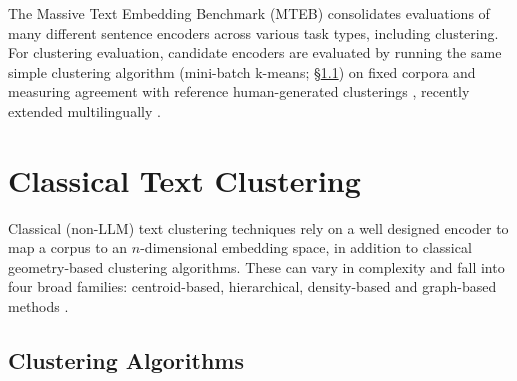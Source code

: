 \documentclass[11pt,a4paper,oneside]{report}
\begin{document}
The Massive Text Embedding Benchmark (MTEB) consolidates evaluations of many different sentence encoders across various task types, including clustering. For clustering evaluation, candidate encoders are evaluated by running the same simple clustering algorithm (mini-batch k-means; \S\ref{sec:algorithms}) on fixed corpora and measuring agreement with reference human-generated clusterings \citep{muennighoff2023mteb}, recently extended multilingually \citep{enevoldsen2025mmteb}.

\section{Classical Text Clustering}\label{sec:clustering}

Classical (non-LLM) text clustering techniques rely on a well designed encoder to map a corpus to an $n$-dimensional embedding space, in addition to classical geometry-based clustering algorithms. These can vary in complexity and fall into four broad families: centroid-based, hierarchical, density-based and graph-based methods \citep{xie2016dec,zhang2021sccl}.

\subsection{Clustering Algorithms}\label{sec:algorithms}
\end{document}
